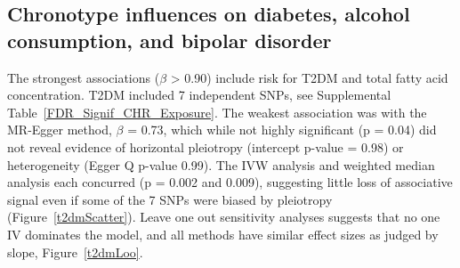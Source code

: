 \documentclass[journal,article,submit,moreauthors,pdftex]{Definitions/mdpi}
\begin{document}
\subsection{Chronotype influences on diabetes, alcohol consumption, and bipolar disorder}
The strongest associations ($\beta$ > 0.90) include risk for T2DM and total fatty acid concentration. T2DM included 7 independent SNPs, see Supplemental Table~\ref{FDR_Signif_CHR_Exposure}. The weakest association was with the MR-Egger method, $\beta$ = 0.73, which while not highly significant (p = 0.04) did not reveal evidence of horizontal pleiotropy (intercept p-value = 0.98) or heterogeneity (Egger Q p-value 0.99). The IVW analysis and weighted median analysis each concurred (p = 0.002 and 0.009), suggesting little loss of associative signal even if some of the 7 SNPs were biased by pleiotropy (Figure~\ref{t2dmScatter}). Leave one out sensitivity analyses suggests that no one IV dominates the model, and all methods have similar effect sizes as judged by slope, Figure~\ref{t2dmLoo}. 
\end{document}
